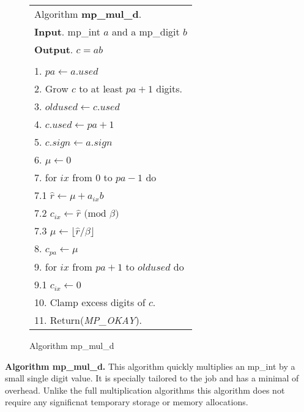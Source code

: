 \documentclass[b5paper]{book}
\begin{document}
\begin{figure}[!here]
\begin{small}
\begin{center}
\begin{tabular}{l}
\hline Algorithm \textbf{mp\_mul\_d}. \\
\textbf{Input}.   mp\_int $a$ and a mp\_digit $b$ \\
\textbf{Output}.  $c = ab$ \\
\hline \\
1.  $pa \leftarrow a.used$ \\
2.  Grow $c$ to at least $pa + 1$ digits. \\
3.  $oldused \leftarrow c.used$ \\
4.  $c.used \leftarrow pa + 1$ \\
5.  $c.sign \leftarrow a.sign$ \\
6.  $\mu \leftarrow 0$ \\
7.  for $ix$ from $0$ to $pa - 1$ do \\
\hspace{3mm}7.1  $\hat r \leftarrow \mu + a_{ix}b$ \\
\hspace{3mm}7.2  $c_{ix} \leftarrow \hat r \mbox{ (mod }\beta\mbox{)}$ \\
\hspace{3mm}7.3  $\mu \leftarrow \lfloor \hat r / \beta \rfloor$ \\
8.  $c_{pa} \leftarrow \mu$ \\
9.  for $ix$ from $pa + 1$ to $oldused$ do \\
\hspace{3mm}9.1  $c_{ix} \leftarrow 0$ \\
10.  Clamp excess digits of $c$. \\
11.  Return(\textit{MP\_OKAY}). \\
\hline
\end{tabular}
\end{center}
\end{small}
\caption{Algorithm mp\_mul\_d}
\end{figure}
\textbf{Algorithm mp\_mul\_d.}
This algorithm quickly multiplies an mp\_int by a small single digit value.  It is specially tailored to the job and has a minimal of overhead.  
Unlike the full multiplication algorithms this algorithm does not require any significnat temporary storage or memory allocations.  
\end{document}
